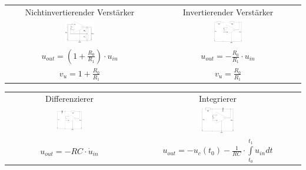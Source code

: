 \documentclass[a4paper,twocolumn,10pt]{article}
\begin{document}
\begin{tabular}{c|c}
	Nichtinvertierender Verstärker & Invertierender Verstärker\\
	\includegraphics[width=0.2\textwidth]{img/OP_NiV} &
	\includegraphics[width=0.2\textwidth]{img/OP_IV}\\
	$u_{out}=(1+\frac{R_0}{R_1})\cdot u_{in}$ & $u_{out}=-\frac{R_0}{R_1}\cdot u_{in}$\\
	$v_u=1+\frac{R_0}{R_1}$ & $v_u=\frac{R_0}{R_1}$
\end{tabular}


\begin{tabular}{c|c}
	Differenzierer & Integrierer\\
	\includegraphics[width=0.2\textwidth]{img/OP_Diff} & \includegraphics[width=0.2\textwidth]{img/OP_Int}\\
	$u_{out}=-RC\cdot \dot{u}_{in}$ & 
	$u_{out}=-u_c(t_0)-\frac{1}{RC}\cdot \int\limits_{t_0}^{t_1}u_{in}dt$
\end{tabular}
\end{document}
